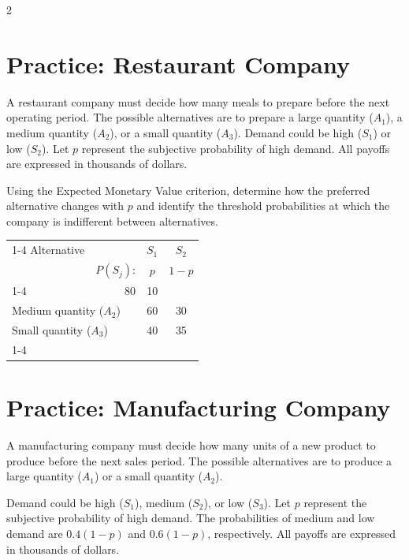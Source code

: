 \begin{multicols}{2}
	\newpage
	
	\section{Practice: Restaurant Company}
	
	A restaurant company must decide how many meals to prepare before the
	next operating period. The possible alternatives are to prepare a large
	quantity ($A_1$), a medium quantity ($A_2$), or a small quantity ($A_3$). Demand could be high ($S_1$) or low ($S_2$). Let $p$ represent the
	subjective probability of high demand. All payoffs are expressed in thousands of dollars.
	
	Using the Expected Monetary Value criterion, determine how the preferred
	alternative changes with $p$ and identify the threshold probabilities at
	which the company is indifferent between alternatives.
	
	\vspace{-3mm}
	
	\begin{center}
		\renewcommand{\arraystretch}{1.3}
		\small
		\begin{tabular}{lr@{\qquad}cc}
			\cmidrule{1-4}
			Alternative & & $S_1$ & $S_2$ \\
			& $P(S_j)$: & $p$ & $1-p$ \\
			\cmidrule{1-4}
			\multicolumn{2}{l}{Large quantity ($A_1$)} & 80 & 10 \\
			\multicolumn{2}{l}{Medium quantity ($A_2$)} & 60 & 30 \\
			\multicolumn{2}{l}{Small quantity ($A_3$)} & 40 & 35 \\
			\cmidrule{1-4}
		\end{tabular}
	\end{center}
	
	\section{Practice: Manufacturing Company}
	
	A manufacturing company must decide how many units of a new product to
	produce before the next sales period. The possible alternatives are to
	produce a large quantity ($A_1$) or a small quantity ($A_2$).
	
	Demand could be high ($S_1$), medium ($S_2$), or low ($S_3$). Let $p$
	represent the subjective probability of high demand. The probabilities
	of medium and low demand are $0.4(1-p)$ and $0.6(1-p)$, respectively.
	All payoffs are expressed in thousands of dollars.
	

\end{multicols}
